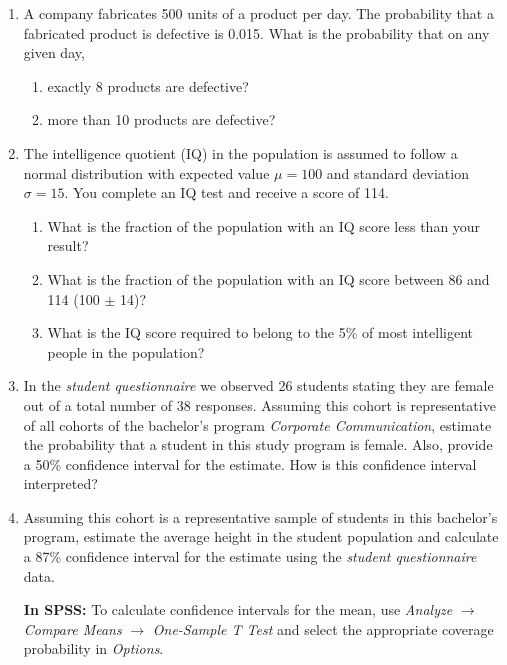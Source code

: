 \documentclass[a4paper, fleqn]{article}
\begin{document}
\begin{enumerate}
  \vspace{1em}
  \item A company fabricates 500 units of a product per day. The probability that a fabricated product is defective is 0.015. What is the probability that on any given day, 
    \begin{enumerate}
      \item exactly 8 products are defective?
      \item more than 10 products are defective?
    \end{enumerate}

  \vspace{1em}
  \item The intelligence quotient (IQ) in the population is assumed to follow a normal distribution with expected value $\mu = 100$ and standard deviation $\sigma = 15$. You complete an IQ test and receive a score of 114. 
    \begin{enumerate}
      \item What is the fraction of the population with an IQ score less than your result? 
      \item What is the fraction of the population with an IQ score between 86 and 114 (100 $\pm$ 14)?  
      \item What is the IQ score required to belong to the 5\% of most intelligent people in the population?
    \end{enumerate}

  \vspace{1em}
\item In the \textit{student questionnaire} we observed 26 students stating they are female out of a total number of 38 responses. Assuming this cohort is representative of all cohorts of the bachelor's program \textit{Corporate Communication}, estimate the probability that a student in this study program is female. Also, provide a 50\% confidence interval for the estimate. How is this confidence interval interpreted?

  \vspace{1em}
  \item Assuming this cohort is a representative sample of students in this bachelor's program, estimate the average height in the student population and calculate a 87\% confidence interval for the estimate using the \textit{student questionnaire} data. 

    \vspace{0.5em}
    \textbf{In SPSS:} To calculate confidence intervals for the mean, use \textit{Analyze} $\rightarrow$ \textit{Compare Means} $\rightarrow$ \textit{One-Sample T Test} and select the appropriate coverage probability in \textit{Options}.
\end{enumerate}
\end{document}
